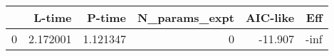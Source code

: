 \begin{tabular}{lrrrrr}
\toprule
{} &    L-time &    P-time &  N\_params\_expt &  AIC-like &  Eff \\
\midrule
0 &  2.172001 &  1.121347 &              0 &   -11.907 & -inf \\
\bottomrule
\end{tabular}
